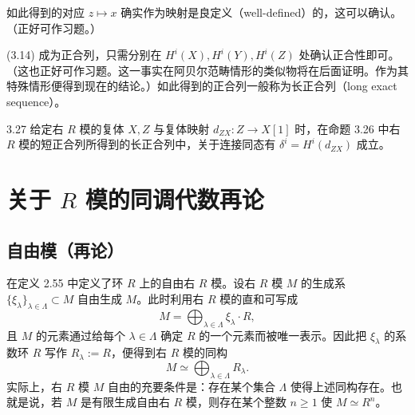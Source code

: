 
如此得到的对应 $z\mapsto x$ 确实作为映射是良定义（well-defined）的，这可以确认。（正好可作习题。）

(3.14) 成为正合列，只需分别在 $H^i(X),H^i(Y),H^i(Z)$ 处确认正合性即可。（这也正好可作习题。这一事实在阿贝尔范畴情形的类似物将在后面证明。作为其特殊情形便得到现在的结论。）如此得到的正合列一般称为长正合列（long exact sequence）。

\begin{proposition}{3.27}
给定右 $R$ 模的复体 $X,Z$ 与复体映射 $d_{ZX}\colon Z\to X[1]$ 时，在命题 3.26 中右 $R$ 模的短正合列所得到的长正合列中，关于连接同态有 $\delta^i=H^i(d_{ZX})$ 成立。
\end{proposition}


\section{关于 $R$ 模的同调代数再论}

\subsection{自由模（再论）}

在定义 2.55 中定义了环 $R$ 上的自由右 $R$ 模。设右 $R$ 模 $M$ 的生成系 $\{\xi_\lambda\}_{\lambda\in\Lambda}\subset M$ 自由生成 $M$。此时利用右 $R$ 模的直和可写成
\[
M=\bigoplus_{\lambda\in\Lambda}\xi_\lambda\cdot R,
\]
且 $M$ 的元素通过给每个 $\lambda\in\Lambda$ 确定 $R$ 的一个元素而被唯一表示。因此把 $\xi_\lambda$ 的系数环 $R$ 写作 $R_\lambda:=R$，便得到右 $R$ 模的同构
\[
M\simeq\bigoplus_{\lambda\in\Lambda}R_\lambda.
\]
实际上，右 $R$ 模 $M$ 自由的充要条件是：存在某个集合 $\Lambda$ 使得上述同构存在。也就是说，若 $M$ 是有限生成自由右 $R$ 模，则存在某个整数 $n\ge 1$ 使 $M\simeq R^n$。

